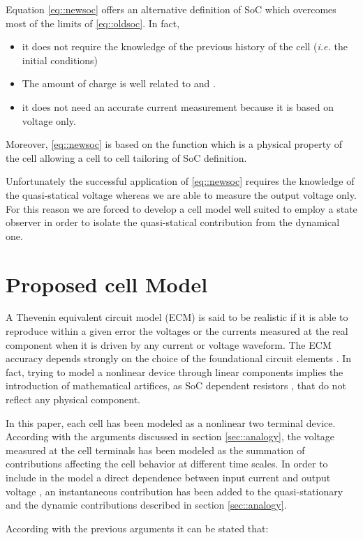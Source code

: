\documentclass[journal]{IEEEtran}
\begin{document}
Equation \eqref{eq::newsoc} offers an alternative definition of SoC which overcomes most of the limits of \eqref{eq::oldsoc}. In fact, 
\begin{itemize}
\item it does not require the knowledge of the previous history of the cell (\textit{i.e.} the initial conditions)
\item The amount of charge  is well related to  and .
\item it does not need an accurate current measurement because it is based on voltage only.
\end{itemize}
Moreover, \eqref{eq::newsoc} is based on the function  which is a physical property of the cell allowing a cell to cell tailoring of SoC definition.

Unfortunately the successful application of \eqref{eq::newsoc} requires the knowledge of the quasi-statical voltage  whereas we are able to measure the output voltage  only.
For this reason we are forced to develop a cell model well suited to employ a state observer in order to isolate the quasi-statical contribution from the dynamical one. 
\section{Proposed cell Model}
\label{sec::model}
A Thevenin equivalent circuit model (ECM) is said to be realistic if it is able to reproduce within a given error the voltages or the currents measured at the real component when it is driven by any current or voltage waveform. The ECM accuracy depends strongly on the choice of the foundational circuit elements \cite{Chua_2003}. 
In fact, trying to model a nonlinear device through linear components implies the introduction of mathematical artifices, as SoC dependent resistors \cite{Huria_2014, Rahmoun_2012, He_2011}, that do not reflect any physical component.

In this paper, each cell has been modeled as a nonlinear two terminal device. According with the arguments discussed in section \ref{sec::analogy}, the voltage measured at the cell terminals has been modeled as the summation of contributions affecting the cell behavior at different time scales.
In order to include in the model a direct dependence between input current  and output voltage , an instantaneous contribution  has been added to the quasi-stationary  and the dynamic  contributions described in section \ref{sec::analogy}.

According with the previous arguments it can be stated that:
\end{document}
